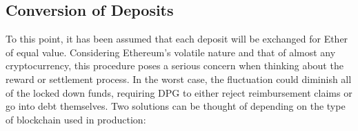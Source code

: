 

\subsection{Conversion of Deposits}
\label{sec:depositConversion}
To this point, it has been assumed that each deposit will be exchanged for Ether of equal value. Considering Ethereum's volatile nature and that of almost any cryptocurrency, this procedure poses a serious concern when thinking about the reward or settlement process. In the worst case, the fluctuation could diminish all of the locked down funds, requiring \ac{DPG} to either reject reimbursement claims or go into debt themselves. Two solutions can be thought of depending on the type of blockchain used in production:


